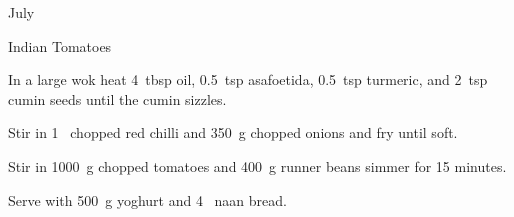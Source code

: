 \begin{menu}{July}
\begin{recipe}{2}{Indian Tomatoes}
\begin{ingredients}
		\end{ingredients}
	
	
    \begin{instructions}
    \item 
        In a large wok heat
        4~tbsp  oil,
        0.5~tsp  asafoetida,
        0.5~tsp  turmeric,
        and
        2~tsp  cumin seeds
        until
        the cumin sizzles.
      \item 
        Stir in
        1~ chopped red chilli
        and
        350~g chopped onions
        and
        fry until soft.
      \item 
        Stir in
        1000~g chopped tomatoes
        and
        400~g  runner beans
        simmer for 15 minutes.
      \item 
        Serve with
        500~g  yoghurt
        and
        4~  naan bread.
      
    \end{instructions}
    \end{recipe}%
  
    \clearpage
    \end{menu}
	
